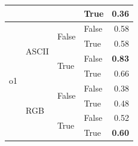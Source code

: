 \documentclass{article}
\begin{document}
\begin{table}
\begin{center}
{\begin{tabular}{@{}llllr@{}}
                                                                        &                           &                           & True                      & \textbf{0.36} \\
    \midrule
    \multirow[c]{8}{*}{o1}                                              & \multirow[c]{4}{*}{ASCII} & \multirow[c]{2}{*}{False} & False                     & 0.58 \\
                                                                        &                           &                           & True                      & 0.58 \\
                                                                        &                           & \multirow[c]{2}{*}{True}  & False                     & \textbf{0.83} \\
                                                                        &                           &                           & True                      & 0.66 \\
    \cmidrule{2-5}
                                                                        & \multirow[c]{4}{*}{RGB}   & \multirow[c]{2}{*}{False} & False                     & 0.38 \\
                                                                        &                           &                           & True                      & 0.48 \\
                                                                        &                           & \multirow[c]{2}{*}{True}  & False                     & 0.52 \\
                                                                        &                           &                           & True                      & \textbf{0.60} \\
   \bottomrule
\end{tabular}
}
    \end{center}
    \label{tab:tic-tac-toe-ablation}
\end{table}
\end{document}
